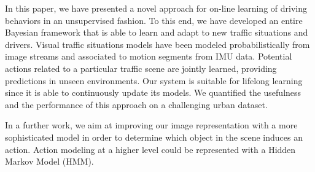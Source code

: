 In this paper, we have presented a novel approach for on-line learning of
driving behaviors in an unsupervised fashion. To this end, we have developed an
entire Bayesian framework that is able to learn and adapt to new traffic
situations and drivers. Visual traffic situations models have been modeled
probabilistically from image streams and associated to motion segments from
IMU data. Potential actions related to a particular traffic scene are jointly
learned, providing predictions in unseen environments. Our system is suitable
for lifelong learning since it is able to continuously update its models. We
quantified the usefulness and the performance of this approach on a challenging
urban dataset.

In a further work, we aim at improving our image representation with a more
sophisticated model in order to determine which object in the scene induces
an action. Action modeling at a higher level could be represented with a Hidden
Markov Model (HMM).
